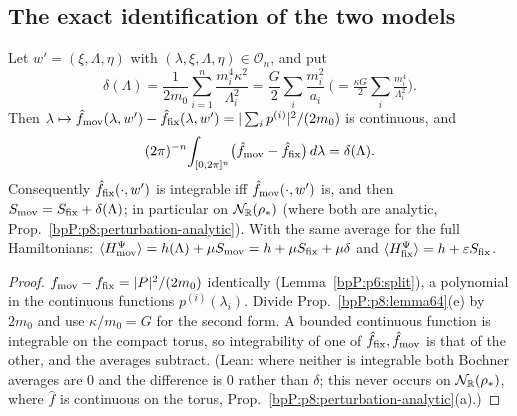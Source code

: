 \subsection{The exact identification of the two models}\label{bpP:p8:sec-ident}

\begin{theorem}\label{bpP:p8:identification}
Let $w'=(\xi,\Lambda,\eta)$ with $(\lambda,\xi,\Lambda,\eta)\in\mathcal O_n$, and put
\[\delta(\Lambda)=\frac1{2m_0}\sum_{i=1}^n\frac{m_i^4\kappa^2}{\Lambda_i^2}=\frac G2\sum_i\frac{m_i^2}{a_i}\ \Big(=\tfrac{\kappa G}{2}\sum_i\tfrac{m_i^4}{\Lambda_i^2}\Big).\]
Then $\lambda\mapsto\hat f_{\rm mov}(\lambda,w')-\hat f_{\rm fix}(\lambda,w')=|\sum_ip^{(i)}|^2/(2m_0)$ is continuous, and
\[(2\pi)^{-n}\!\int_{[0,2\pi]^n}\!\big(\hat f_{\rm mov}-\hat f_{\rm fix}\big)\,d\lambda=\delta(\Lambda).\]
Consequently $\hat f_{\rm fix}(\cdot,w')$ is integrable iff $\hat f_{\rm mov}(\cdot,w')$ is, and then $S_{\rm mov}=S_{\rm fix}+\delta(\Lambda)$; in particular on $\mathcal N_{\mathbb{R}}(\rho_*)$ (where both are analytic, Prop.~\ref{bpP:p8:perturbation-analytic}). With the same average for the full Hamiltonians: $\langle H_{\rm mov}^\Psi\rangle=h(\Lambda)+\mu S_{\rm mov}=h+\mu S_{\rm fix}+\mu\delta$ and $\langle H_{\rm fix}^\Psi\rangle=h+\varepsilon S_{\rm fix}$.
\end{theorem}
\begin{proof}
\label{stepP:p8:id-diff} $f_{\rm mov}-f_{\rm fix}=|P|^2/(2m_0)$ identically (Lemma~\ref{bpP:p6:split}), a polynomial in the continuous functions $p^{(i)}(\lambda_i)$.
\label{stepP:p8:id-avg} Divide Prop.~\ref{bpP:p8:lemma64}(e) by $2m_0$ and use $\kappa/m_0=G$ for the second form.
\label{stepP:p8:id-int} A bounded continuous function is integrable on the compact torus, so integrability of one of $\hat f_{\rm fix},\hat f_{\rm mov}$ is that of the other, and the averages subtract. (Lean: where neither is integrable both Bochner averages are $0$ and the difference is $0$ rather than $\delta$; this never occurs on $\mathcal N_{\mathbb{R}}(\rho_*)$, where $\hat f$ is continuous on the torus, Prop.~\ref{bpP:p8:perturbation-analytic}(a).)
\end{proof}

